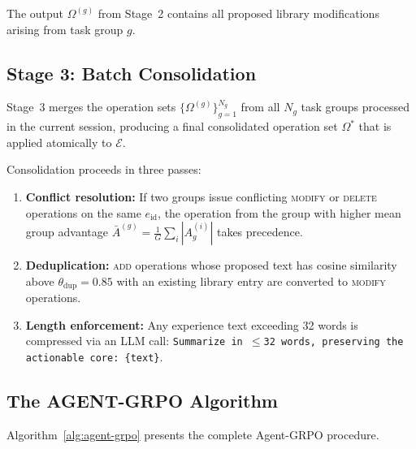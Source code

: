\documentclass[11pt]{article}
\begin{document}
The output $\Omega^{(g)}$ from Stage~2 contains all proposed library
modifications arising from task group $g$.

\subsection{Stage 3: Batch Consolidation}
\label{sec:stage3}

Stage~3 merges the operation sets $\{\Omega^{(g)}\}_{g=1}^{N_g}$ from all
$N_g$ task groups processed in the current session, producing a final
consolidated operation set $\Omega^*$ that is applied atomically to $\mathcal{E}$.

Consolidation proceeds in three passes:

\begin{enumerate}[leftmargin=1.5em]
    \item \textbf{Conflict resolution:} If two groups issue conflicting
          \textsc{modify} or \textsc{delete} operations on the same $e_{\text{id}}$,
          the operation from the group with higher mean group advantage
          $\bar{A}^{(g)} = \frac{1}{G}\sum_i |A^{(i)}_g|$ takes precedence.
    \item \textbf{Deduplication:} \textsc{add} operations whose proposed text
          has cosine similarity above $\theta_{\text{dup}} = 0.85$ with an
          existing library entry are converted to \textsc{modify} operations.
    \item \textbf{Length enforcement:} Any experience text exceeding 32 words
          is compressed via an LLM call: \texttt{Summarize in $\leq$32 words,
          preserving the actionable core: \{text\}}.
\end{enumerate}

\subsection{The AGENT-GRPO Algorithm}
\label{sec:algorithm}

Algorithm~\ref{alg:agent-grpo} presents the complete Agent-GRPO procedure.
\end{document}
